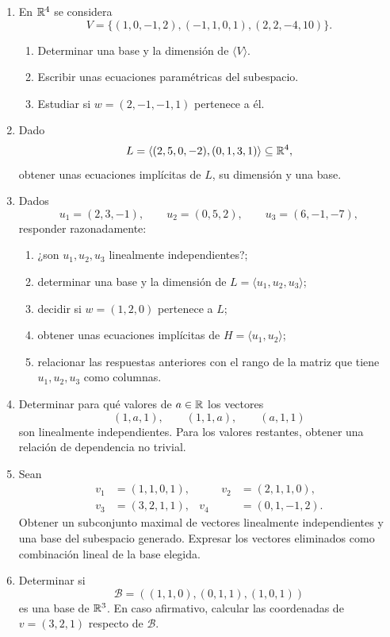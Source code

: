 \begin{enumerate}[label=\textbf{\arabic*.},leftmargin=*]
\item En $\mathbb{R}^4$ se considera
\[
V=\{(1,0,-1,2),(-1,1,0,1),(2,2,-4,10)\}.
\]
\begin{enumerate}[label=\alph*)]
\item Determinar una base y la dimensión de $\langle V\rangle$.
\item Escribir unas ecuaciones paramétricas del subespacio.
\item Estudiar si $w=(2,-1,-1,1)$ pertenece a él.
\end{enumerate}

\item Dado
\[
L=\langle(2,5,0,-2),(0,1,3,1)\rangle\subseteq\mathbb{R}^4,
\]
obtener unas ecuaciones implícitas de $L$, su dimensión y una base.

\item Dados
\[
u_1=(2,3,-1),\qquad
u_2=(0,5,2),\qquad
u_3=(6,-1,-7),
\]
responder razonadamente:
\begin{enumerate}[label=\alph*)]
\item ¿son $u_1,u_2,u_3$ linealmente independientes?;
\item determinar una base y la dimensión de $L=\langle u_1,u_2,u_3\rangle$;
\item decidir si $w=(1,2,0)$ pertenece a $L$;
\item obtener unas ecuaciones implícitas de $H=\langle u_1,u_2\rangle$;
\item relacionar las respuestas anteriores con el rango de la matriz que tiene $u_1,u_2,u_3$ como columnas.
\end{enumerate}

\item Determinar para qué valores de $a\in\mathbb{R}$ los vectores
\[
(1,a,1),\qquad(1,1,a),\qquad(a,1,1)
\]
son linealmente independientes. Para los valores restantes, obtener una relación de dependencia no trivial.

\item Sean
\[
\begin{aligned}
v_1&=(1,1,0,1),&\qquad v_2&=(2,1,1,0),\\
v_3&=(3,2,1,1),& v_4&=(0,1,-1,2).
\end{aligned}
\]
Obtener un subconjunto maximal de vectores linealmente independientes y una base del subespacio generado. Expresar los vectores eliminados como combinación lineal de la base elegida.

\item Determinar si
\[
\mathcal B=((1,1,0),(0,1,1),(1,0,1))
\]
es una base de $\mathbb{R}^3$. En caso afirmativo, calcular las coordenadas de $v=(3,2,1)$ respecto de $\mathcal B$.


\end{enumerate}
